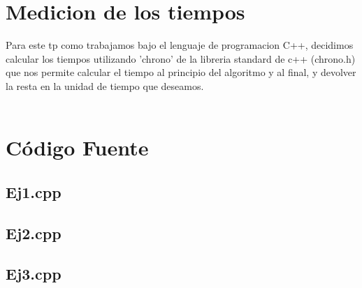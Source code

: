 \section{Medicion de los tiempos}

Para este tp como trabajamos bajo el lenguaje de programacion C++, decidimos calcular los tiempos utilizando 'chrono' de la libreria standard de c++ (chrono.h) que nos permite calcular el tiempo al principio del algoritmo y al final, y devolver la resta en la unidad de tiempo que deseamos.\\ \\

\newpage
\section{C\'odigo Fuente}
\subsection{Ej1.cpp}


\newpage
\subsection{Ej2.cpp}


\newpage
\subsection{Ej3.cpp}


